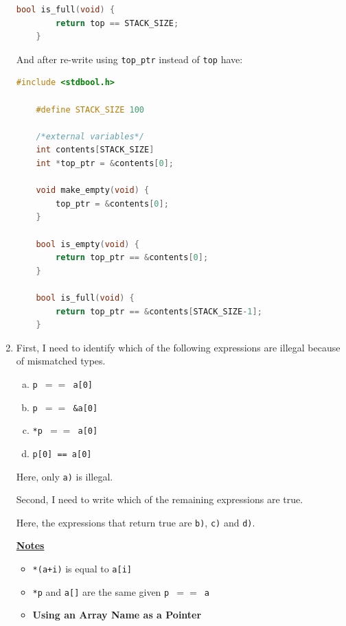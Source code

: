 \documentclass[12pt]{article}
\begin{document}
\begin{enumerate}[1.]
\begin{lstlisting}[language=c]
    bool is_full(void) {
        return top == STACK_SIZE;
    }
\end{lstlisting}

    \bigskip

    And after re-write using \texttt{top\_ptr} instead of \texttt{top} have:


\begin{lstlisting}[language=c]
    #include <stdbool.h>

    #define STACK_SIZE 100

    /*external variables*/
    int contents[STACK_SIZE]
    int *top_ptr = &contents[0];

    void make_empty(void) {
        top_ptr = &contents[0];
    }

    bool is_empty(void) {
        return top_ptr == &contents[0];
    }

    bool is_full(void) {
        return top_ptr == &contents[STACK_SIZE-1];
    }
\end{lstlisting}

    \item

    First, I need to identify which of the following expressions are illegal
    because of mismatched types.

    \bigskip

    \begin{enumerate}[a)]
        \item \texttt{p $==$ a[0]}
        \item \texttt{p $==$ \&a[0]}
        \item \texttt{*p $==$ a[0]}
        \item \texttt{p[0] == a[0]}
    \end{enumerate}

    \bigskip

    Here, only \texttt{a)} is illegal.

    \bigskip

    Second, I need to write which of the remaining expressions are true.

    \bigskip

    Here, the expressions that return true are \texttt{b)}, \texttt{c)} and \texttt{d)}.

    \bigskip

    \underline{\textbf{Notes}}

    \begin{itemize}
        \item \texttt{*(a+i)} is equal to \texttt{a[i]}
        \item \texttt{*p} and \texttt{a[]} are the same given \texttt{p $==$ a}
        \item \textbf{Using an Array Name as a Pointer}


\end{itemize}
\end{enumerate}
\end{document}
